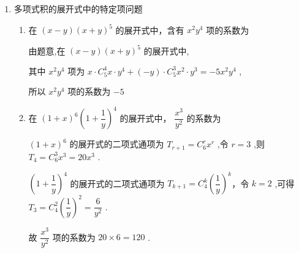 \begin{enumerate}
\begin{enumerate}
\begin{jieda}
            设二项式展开式中第 $r + 1$ 项的系数最大,则有 $\left\{  \begin{array}{l} {2}^{-r}{{C}}_{6}^{r} \geq  {2}^{-\left( {r - 1}\right) }{{C}}_{6}^{r - 1} \\  {2}^{-r}{{C}}_{6}^{r} \geq  {2}^{-\left( {r + 1}\right) }{{C}}_{6}^{r + 1} \end{array}\right.$ ,
            
            $\Longrightarrow  \left\{  \begin{array}{l} r \leq  \dfrac{7}{3} \\  r \geq  \dfrac{4}{3} \end{array}\right.$ ,即 $\dfrac{4}{3} \leq  r \leq  \dfrac{7}{3}$ ,故 $r = 2$ ,经检验符合题意，所以展开式中系数最大的项是第 3 项.
        \end{jieda}
    \end{enumerate}
    
    \item 多项式积的展开式中的特定项问题
    \begin{enumerate}
        \item 在 $\left( {x - y}\right) {\left( x + y\right) }^{5}$ 的展开式中，含有 ${x}^{2}{y}^{4}$ 项的系数为
        \begin{jieda}
            由题意,在 $\left( {x - y}\right) {\left( x + y\right) }^{5}$ 的展开式中,
            
            其中 ${x}^{2}{y}^{4}$ 项为 $x \cdot  {{C}}_{5}^{4}x \cdot  {y}^{4} + \left( {-y}\right)  \cdot  {{C}}_{5}^{3}{x}^{2} \cdot  {y}^{3} =  - 5{x}^{2}{y}^{4}$ ,
            
            所以 ${x}^{2}{y}^{4}$ 项的系数为 $-5$
        \end{jieda}
        
        \item 在 ${\left( 1 + x\right) }^{6}{\left( 1 + \dfrac{1}{y}\right) }^{4}$ 的展开式中， $\dfrac{{x}^{3}}{{y}^{2}}$ 的系数为
        \begin{jieda}
            ${\left( 1 + x\right) }^{6}$ 的展开式的二项式通项为 ${T}_{r + 1} = {{C}}_{6}^{r}{x}^{r}$ ,令 $r = 3$ ,则 ${T}_{4} = {{C}}_{6}^{3}{x}^{3} = {20}{x}^{3}$ .
            
            ${\left( 1 + \dfrac{1}{y}\right) }^{4}$ 的展开式的二项式通项为 ${T}_{k + 1} = {{C}}_{4}^{k}{\left( \dfrac{1}{y}\right) }^{k}$，令 $k = 2$ ,可得 ${T}_{3} = {{C}}_{4}^{2}{\left( \dfrac{1}{y}\right) }^{2} = \dfrac{6}{{y}^{2}}$ .
            
            故 $\dfrac{{x}^{3}}{{y}^{2}}$ 项的系数为 ${20} \times  6 = {120}$ .
        \end{jieda}
        

\end{enumerate}
\end{enumerate}
